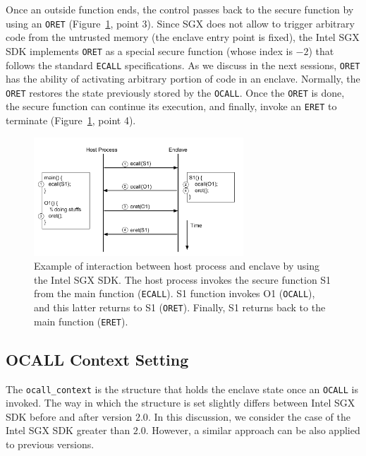 Once an outside function ends, the control passes back to the secure function 
by using an \texttt{ORET} (Figure~\ref{fig:synch-exit}, point 3).
Since SGX does not allow to trigger arbitrary code from the untrusted memory 
(\ie the enclave entry point is fixed),
the Intel SGX SDK implements \texttt{ORET} as a special secure function (whose 
index is $-2$) that follows the standard \texttt{ECALL} specifications.
As we discuss in the next sessions, \texttt{ORET} has the ability of activating
arbitrary portion of code in an enclave. 
Normally, the \texttt{ORET} restores the state previously 
stored by the \texttt{OCALL}.
Once the \texttt{ORET} is done, the secure function can continue its execution,
and finally, invoke an \texttt{ERET} to terminate 
(Figure~\ref{fig:synch-exit}, point 4).

\begin{figure}[t]
	\centering
	\includegraphics[width=0.7\textwidth]{fig_c5/synch-exit.pdf}
	\caption{Example of interaction between host 
		process and enclave by using the Intel SGX SDK. The host process 
		invokes 
		the secure function S1 from the main function (\texttt{ECALL}). S1 
		function 
		invokes O1 (\texttt{OCALL}), and this latter returns to S1 
		(\texttt{ORET}). 
		Finally, S1 returns back to the main function (\texttt{ERET}).}
	\label{fig:synch-exit}
\end{figure}

\subsection{OCALL Context Setting}
\label{ssec:ocall-context}

The \texttt{ocall\_context} is the structure that holds the enclave state once 
an \texttt{OCALL} is invoked.
The way in which the structure is set slightly differs between Intel SGX SDK 
before and after version $2.0$.
In this discussion, we consider the case of the Intel SGX SDK greater than 
$2.0$. However, a similar approach can be also applied to previous versions.

